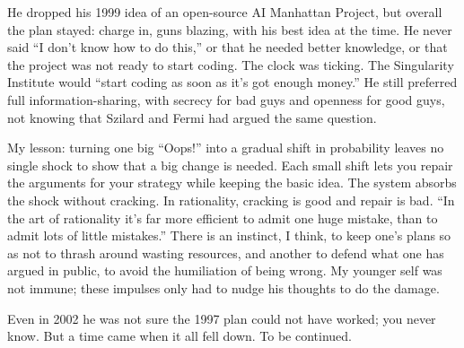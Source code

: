 He dropped his 1999 idea of an open-source AI Manhattan Project, but overall the plan stayed: charge in, guns blazing, with his best idea at the time. He never said ``I don't know how to do this,'' or that he needed better knowledge, or that the project was not ready to start coding. The clock was ticking. The Singularity Institute would ``start coding as soon as it's got enough money.'' He still preferred full information-sharing, with secrecy for bad guys and openness for good guys, not knowing that Szilard and Fermi had argued the same question. 

My lesson: turning one big ``Oops!'' into a gradual shift in probability leaves no single shock to show that a big change is needed. Each small shift lets you repair the arguments for your strategy while keeping the basic idea. The system absorbs the shock without cracking. In rationality, cracking is good and repair is bad. ``In the art of rationality it's far more efficient to admit one huge mistake, than to admit lots of little mistakes.''  There is an instinct, I think, to keep one's plans so as not to thrash around wasting resources, and another to defend what one has argued in public, to avoid the humiliation of being wrong. My younger self was not immune; these impulses only had to nudge his thoughts to do the damage.

Even in 2002 he was not sure the 1997 plan could not have worked; you never know. But a time came when it all fell down. To be continued.
